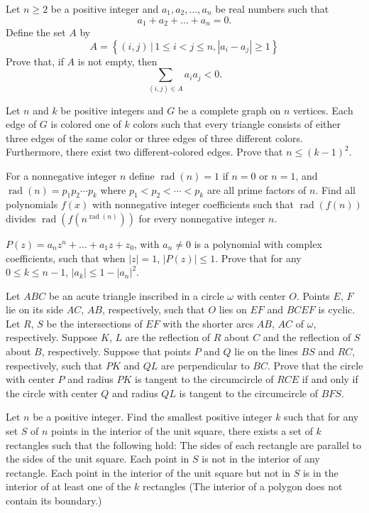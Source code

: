 \documentclass[11pt]{scrartcl}
\begin{document}
\begin{problem}[781756252908608]
Let $n\geqslant 2$ be a positive integer and $a_1,a_2, \ldots ,a_n$ be real numbers such that\[a_1+a_2+\dots+a_n=0.\]Define the set $A$ by
\[A=\left\{(i, j)\,|\,1 \leqslant i<j \leqslant n,\left|a_{i}-a_{j}\right| \geqslant 1\right\}\]Prove that, if $A$ is not empty, then
\[\sum_{(i, j) \in A} a_{i} a_{j}<0.\]
\end{problem}
\begin{problem}[785479468600231]
Let $n$ and $k$ be positive integers and $G$ be a complete graph on $n$ vertices. Each edge of $G$ is colored one of $k$ colors such that every triangle consists of either three edges of the same color or three edges of three different colors. Furthermore, there exist two different-colored edges. Prove that $n\le(k-1)^2$.
\end{problem}
\begin{problem}[790369865925596]
For a nonnegative integer $n$ define $\operatorname{rad}(n)=1$ if $n=0$ or $n=1$, and $\operatorname{rad}(n)=p_1p_2\cdots p_k$ where $p_1<p_2<\cdots <p_k$ are all prime factors of $n$. Find all polynomials $f(x)$ with nonnegative integer coefficients such that $\operatorname{rad}(f(n))$ divides $\operatorname{rad}(f(n^{\operatorname{rad}(n)}))$ for every nonnegative integer $n$.
\end{problem}
\begin{problem}[791789753842496]
$P(z)=a_nz^n+\dots+a_1z+z_0$, with $a_n\neq 0$ is a polynomial with complex coefficients, such that when $|z|=1$, $|P(z)|\leq 1$. Prove that for any $0\leq k\leq n-1$, $|a_k|\leq 1-|a_n|^2$.
\end{problem}
\begin{problem}[792293045512112]
	Let $ABC$ be an acute triangle inscribed in a circle $\omega$ with center $O$. Points $E$, $F$ lie on its side $AC$, $AB$, respectively, such that $O$ lies on $EF$ and $BCEF$ is cyclic. Let $R$, $S$ be the intersections of $EF$ with the shorter arcs $AB$, $AC$ of $\omega$, respectively. Suppose $K$, $L$ are the reflection of $R$ about $C$ and the reflection of $S$ about $B$, respectively. Suppose that points $P$ and $Q$ lie on the lines $BS$ and $RC$, respectively, such that $PK$ and $QL$ are perpendicular to $BC$. Prove that the circle with center $P$ and radius $PK$ is tangent to the circumcircle of $RCE$ if and only if the circle with center $Q$ and radius $QL$ is tangent to the circumcircle of $BFS$.
\end{problem}
\begin{problem}[792975361721939]
	Let $n$ be a positive integer. Find the smallest positive integer $k$ such that for any set $S$ of $n$ points in the interior of the unit square, there exists a set of $k$ rectangles such that the following hold:
The sides of each rectangle are parallel to the sides of the unit square.
Each point in $S$ is not in the interior of any rectangle.
Each point in the interior of the unit square but not in $S$ is in the interior of at least one of the $k$ rectangles
(The interior of a polygon does not contain its boundary.)
\end{problem}
\end{document}
